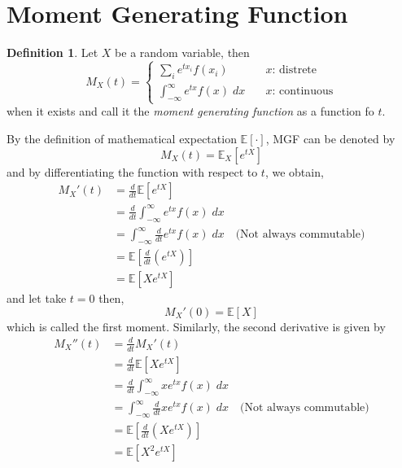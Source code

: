 \documentclass[twoside]{article}
\theoremstyle{definition}
\newtheorem{definition}{Definition}[section]
\theoremstyle{remark}
\theoremstyle{remark}
\begin{document}
\section{Moment Generating Function}
\begin{definition}
  Let $X$ be a random variable, then
  \begin{equation}
    M_X(t) = \left\{
    \begin{array}{ll}
      \sum_i e^{tx_i} f(x_i)                    \quad & \textrm{$x$: distrete}\\[1em]
      \int_{-\infty}^{\infty} e^{tx} f(x) \; dx  \quad & \textrm{$x$: continuous}
    \end{array}
    \right.
  \end{equation}
  when it exists and call it the \textit{moment generating function} as a
  function fo $t$.
\end{definition}
By the definition of mathematical expectation $\mathbb{E}[\cdot]$, MGF can be
denoted by
\begin{equation}
 M_X(t) = \mathbb{E}_X[e^{tX}]
\end{equation}
and by differentiating the function with respect to $t$, we obtain,
\begin{equation}
  \begin{split}
    M_X'(t)
    &= \frac{d}{dt} \mathbb{E}[e^{tX}]   \\
    &= \frac{d}{dt} \int_{-\infty}^{\infty} e^{tx} f(x) \; dx \\
    &= \int_{-\infty}^{\infty} \frac{d}{dt} e^{tx} f(x) \; dx \quad \textrm{(Not always commutable)}\\
    &= \mathbb{E}[\frac{d}{dt} (e^{tX})] \\
    &= \mathbb{E}[X e^{tX}]
  \end{split}
\end{equation}
and let take $t = 0$ then,
\begin{equation}
  M_X'(0) = \mathbb{E}[X]
\end{equation}
which is called the first moment. Similarly, the second derivative is given by
\begin{equation}
  \begin{split}
    M_X''(t)
    &= \frac{d}{dt} M_X'(t) \\
    &= \frac{d}{dt} \mathbb{E}[X e^{tX}] \\
    &= \frac{d}{dt} \int_{-\infty}^{\infty} xe^{tx} f(x) \; dx \\
    &= \int_{-\infty}^{\infty} \frac{d}{dt} xe^{tx} f(x) \; dx \quad \textrm{(Not always commutable)}\\
    &= \mathbb{E}[\frac{d}{dt} (Xe^{tX})] \\
    &= \mathbb{E}[X^2e^{tX}]
  \end{split}
\end{equation}
\end{document}
